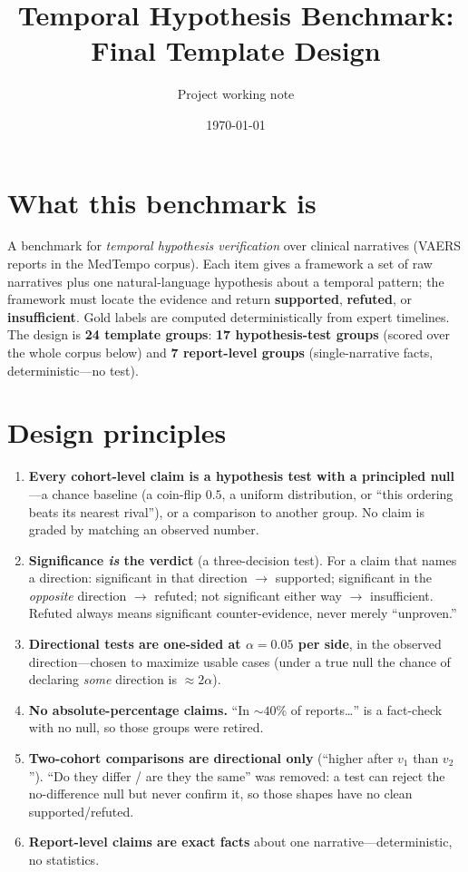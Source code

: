 \documentclass[11pt]{article}
\title{Temporal Hypothesis Benchmark:\\Final Template Design}
\author{Project working note}
\date{\today}
\begin{document}
\maketitle

\section*{What this benchmark is}
A benchmark for \emph{temporal hypothesis verification} over clinical narratives (VAERS reports in the MedTempo corpus). Each item gives a framework a set of raw narratives plus one natural-language hypothesis about a temporal pattern; the framework must locate the evidence and return \textbf{supported}, \textbf{refuted}, or \textbf{insufficient}. Gold labels are computed deterministically from expert timelines. The design is \textbf{24 template groups}: \textbf{17 hypothesis-test groups} (scored over the whole corpus below) and \textbf{7 report-level groups} (single-narrative facts, deterministic---no test).
\section*{Design principles}
\begin{enumerate}\itemsep2pt
\item \textbf{Every cohort-level claim is a hypothesis test with a principled null}---a chance baseline (a coin-flip $0.5$, a uniform distribution, or ``this ordering beats its nearest rival''), or a comparison to another group. No claim is graded by matching an observed number.
\item \textbf{Significance \emph{is} the verdict} (a three-decision test). For a claim that names a direction: significant in that direction $\rightarrow$ supported; significant in the \emph{opposite} direction $\rightarrow$ refuted; not significant either way $\rightarrow$ insufficient. Refuted always means significant counter-evidence, never merely ``unproven.''
\item \textbf{Directional tests are one-sided at $\alpha=0.05$ per side}, in the observed direction---chosen to maximize usable cases (under a true null the chance of declaring \emph{some} direction is ${\approx}2\alpha$).
\item \textbf{No absolute-percentage claims.} ``In ${\sim}40\%$ of reports\ldots'' is a fact-check with no null, so those groups were retired.
\item \textbf{Two-cohort comparisons are directional only} (``higher after $v_1$ than $v_2$''). ``Do they differ / are they the same'' was removed: a test can reject the no-difference null but never confirm it, so those shapes have no clean supported/refuted.
\item \textbf{Report-level claims are exact facts} about one narrative---deterministic, no statistics.
\end{enumerate}
\end{document}
